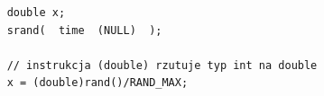 \documentclass{instrukcja}
\begin{document}
\begin{verbatim}
    double x;
    srand(  time  (NULL)  );

    // instrukcja (double) rzutuje typ int na double
    x = (double)rand()/RAND_MAX;

\end{verbatim}






\end{document}
